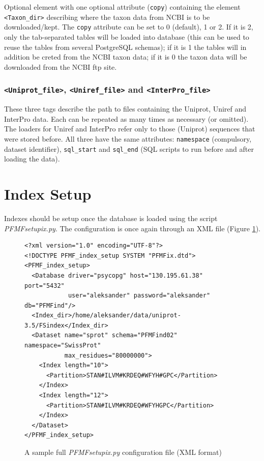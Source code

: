 \documentclass[11pt]{article}
\begin{document}
Optional element with one optional attribute ({\tt copy}) containing the element {\tt <Taxon\_dir>} describing where the taxon data from NCBI is to be downloaded/kept. The {\tt copy} attribute can be set to 0 (default), 1 or 2. If it is 2, only the tab-separated tables will be loaded into database (this can be used to reuse the tables from several PostgreSQL schemas); if it is 1 the tables will in addition be creted from the NCBI taxon data; if it is 0 the taxon data will be downloaded from the NCBI ftp site. 

\subsubsection*{{\tt <Uniprot\_file>}, {\tt <Uniref\_file>} and {\tt <InterPro\_file>}}

These three tags describe the path to files containing the Uniprot, Uniref and InterPro data. Each can be repeated as many times as necessary (or omitted). The loaders for Uniref and InterPro refer only to those (Uniprot) sequences that were stored before. All three have the same attributes: \texttt{namespace} (compulsory, dataset identifier), \texttt{sql\_start} and \texttt{sql\_end} (SQL scripts to run before and after loading the data).

\section{Index Setup}

Indexes should be setup once the database is loaded using the script {\it PFMFsetupix.py}. The configuration is once again through an XML file (Figure \ref{fig:ixconfig}).

\begin{figure}[ht!]
\begin{verbatim}
<?xml version="1.0" encoding="UTF-8"?>
<!DOCTYPE PFMF_index_setup SYSTEM "PFMFix.dtd">
<PFMF_index_setup>
  <Database driver="psycopg" host="130.195.61.38" port="5432"
            user="aleksander" password="aleksander" db="PFMFind"/>
  <Index_dir>/home/aleksander/data/uniprot-3.5/FSindex</Index_dir>
  <Dataset name="sprot" schema="PFMFind02" namespace="SwissProt" 
           max_residues="80000000">
    <Index length="10">
      <Partition>STAN#ILVM#KRDEQ#WFYH#GPC</Partition>
    </Index>
    <Index length="12">
      <Partition>STAN#ILVM#KRDEQ#WFYHGPC</Partition>
    </Index>
  </Dataset>
</PFMF_index_setup>
\end{verbatim}
\caption{A sample full {\it PFMFsetupix.py} configuration file (XML format)}\label{fig:ixconfig}
\end{figure}
\end{document}
